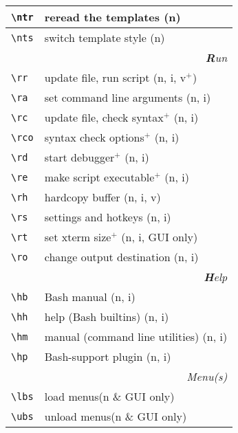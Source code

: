 \documentclass[oneside,12pt,a4paper,DIV18]{scrartcl}
\begin{document}
\begin{center}
\begin{tabular}[]{|p{11mm}|p{59mm}|}
\hline \verb'\ntr' & reread the templates      \hfill (n)\\
\hline \verb'\nts' & switch template style     \hfill (n)\\
\hline
\hline
\multicolumn{2}{|r|}{\textsl{\textbf{R}un}}\\
\hline \verb'\rr'  & update file, run script        \hfill (n, i, v$^+$)\\
\hline \verb'\ra'  & set command line arguments     \hfill (n, i)\\
\hline \verb'\rc'  & update file, check syntax$^+$  \hfill (n, i)\\
\hline \verb'\rco' & syntax check options$^+$       \hfill (n, i)\\
\hline \verb'\rd'  & start debugger$^+$             \hfill (n, i)\\
\hline \verb'\re'  & make script executable$^+$     \hfill (n, i)\\
\hline \verb'\rh'  & hardcopy buffer                \hfill (n, i, v)\\
\hline \verb'\rs'  & settings and hotkeys           \hfill (n, i)\\
\hline \verb'\rt'  & set xterm size$^+$             \hfill (n, i, GUI only)\\
\hline \verb'\ro'  & change output destination      \hfill (n, i)\\
\hline
\hline 
\multicolumn{2}{|r|}{\textsl{\textbf{H}elp}}\\
\hline \verb'\hb'  & Bash manual                     \hfill (n, i)\\
\hline \verb'\hh'  & help (Bash builtins)            \hfill (n, i)\\
\hline \verb'\hm'  & manual (command line utilities) \hfill (n, i)\\
\hline \verb'\hp'  & Bash-support plugin             \hfill (n, i)\\
\hline 
\hline
\multicolumn{2}{|r|}{\textsl{Menu(s)}}\\
\hline \verb'\lbs'  & load    menus\hfill \scriptsize{(n \& GUI only)}\\
\hline \verb'\ubs'  & unload  menus\hfill \scriptsize{(n \& GUI only)}\\
\hline 
\end{tabular}\\%
\vspace{1mm}%
%
\begin{minipage}[b]{70mm}%
\setlength{\fboxsep}{.25mm}%

\end{minipage}
\end{center}
\end{document}
